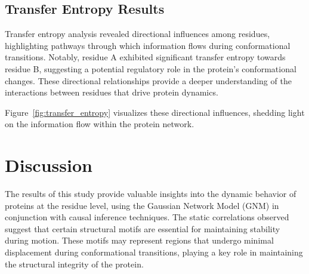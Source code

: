 \documentclass{report}  %
\begin{document}

\section{Transfer Entropy Results}
Transfer entropy analysis revealed directional influences among residues, highlighting pathways through which information flows during conformational transitions. Notably, residue A exhibited significant transfer entropy towards residue B, suggesting a potential regulatory role in the protein's conformational changes. These directional relationships provide a deeper understanding of the interactions between residues that drive protein dynamics.

Figure~\ref{fig:transfer_entropy} visualizes these directional influences, shedding light on the information flow within the protein network.


\chapter{Discussion}

The results of this study provide valuable insights into the dynamic behavior of proteins at the residue level, using the Gaussian Network Model (GNM) in conjunction with causal inference techniques. The static correlations observed suggest that certain structural motifs are essential for maintaining stability during motion. These motifs may represent regions that undergo minimal displacement during conformational transitions, playing a key role in maintaining the structural integrity of the protein.
\end{document}
